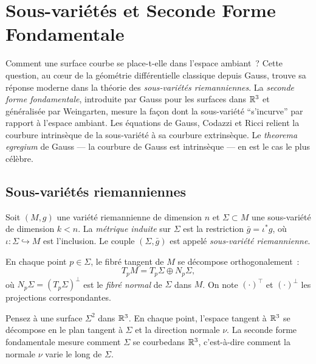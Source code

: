 \chapter{Sous-vari\'et\'es et Seconde Forme Fondamentale}
\label{ch:sous_varietes}

Comment une surface courbe se place-t-elle dans l'espace ambiant~? Cette question, au c\oe ur de la g\'eom\'etrie diff\'erentielle classique depuis Gauss, trouve sa r\'eponse moderne dans la th\'eorie des \emph{sous-vari\'et\'es riemanniennes}. La \emph{seconde forme fondamentale}, introduite par Gauss pour les surfaces dans $\mathbb{R}^3$ et g\'en\'eralis\'ee par Weingarten, mesure la fa\c{c}on dont la sous-vari\'et\'e ``s'incurve'' par rapport \`a l'espace ambiant. Les \'equations de Gauss, Codazzi et Ricci relient la courbure intrins\`eque de la sous-vari\'et\'e \`a sa courbure extrins\`eque. Le \emph{theorema egregium} de Gauss --- la courbure de Gauss est intrins\`eque --- en est le cas le plus c\'el\`ebre.

\section{Sous-vari\'et\'es riemanniennes}

\begin{definition}
Soit $(M, g)$ une vari\'et\'e riemannienne de dimension $n$ et $\Sigma \subset M$
une sous-vari\'et\'e de dimension $k < n$. La \emph{m\'etrique induite} sur $\Sigma$
est la restriction $\bar{g} = \iota^* g$, o\`u $\iota : \Sigma \hookrightarrow M$
est l'inclusion. Le couple $(\Sigma, \bar{g})$ est appel\'e \emph{sous-vari\'et\'e
riemannienne}.
\end{definition}

\begin{definition}
En chaque point $p \in \Sigma$, le fibr\'e tangent de $M$ se d\'ecompose orthogonalement~:
\[
    T_pM = T_p\Sigma \oplus N_p\Sigma,
\]
o\`u $N_p\Sigma = (T_p\Sigma)^\perp$ est le \emph{fibr\'e normal} de $\Sigma$ dans $M$.
On note $(\cdot)^\top$ et $(\cdot)^\perp$ les projections correspondantes.
\end{definition}

\begin{intuition}
Pensez \`a une surface $\Sigma^2$ dans $\mathbb{R}^3$. En chaque point, l'espace tangent \`a $\mathbb{R}^3$
se d\'ecompose en le plan tangent \`a $\Sigma$ et la direction normale $\nu$. La seconde
forme fondamentale mesure comment $\Sigma$ \og{}se courbe\fg dans $\mathbb{R}^3$, c'est-\`a-dire
comment la normale $\nu$ varie le long de $\Sigma$.
\end{intuition}


